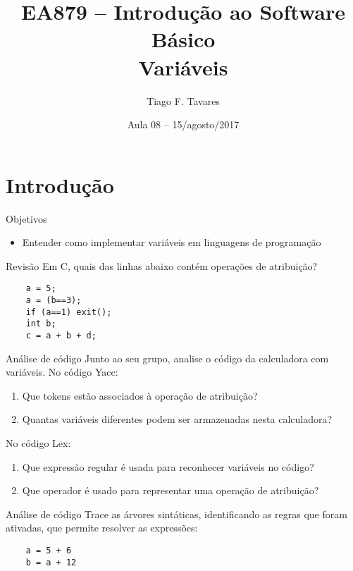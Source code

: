 \documentclass{beamer}
\title[08-Variáveis]{EA879 -- Introdução ao Software Básico\\Variáveis}
\author{Tiago F. Tavares}
\institute{FEEC -- UNICAMP}
\date{Aula 08 -- 15/agosto/2017}
\begin{document}
\begin{frame}
  \titlepage
\end{frame}


\section{Introdução}

\begin{frame}{Objetivos}
  \Large
  \begin{itemize}
    \item Entender como implementar variáveis em linguagens de programação
  \end{itemize}
\end{frame}


\begin{frame}[fragile]{Revisão}
  \centering
  \large
  Em C, quais das linhas abaixo contém operações de atribuição?
  \begin{verbatim}
    a = 5;
    a = (b==3);
    if (a==1) exit();
    int b;
    c = a + b + d;
  \end{verbatim}
\end{frame}

\begin{frame}[fragile]{Análise de código}
  \centering
  \large
  Junto ao seu grupo, analise o código da calculadora com variáveis. No código
  Yacc:
  \begin{enumerate}
    \item Que tokens estão associados à operação de atribuição?
    \item Quantas variáveis diferentes podem ser armazenadas nesta calculadora?
  \end{enumerate}

  No código Lex:
  \begin{enumerate}
    \item Que expressão regular é usada para reconhecer variáveis no código?
    \item Que operador é usado para representar uma operação de atribuição?
  \end{enumerate}
\end{frame}

\begin{frame}[fragile]{Análise de código}
  \centering
  \large
    Trace as árvores sintáticas, identificando as regras que foram ativadas, que
    permite resolver as expressões:
    \begin{verbatim}
    a = 5 + 6
    b = a + 12
    \end{verbatim}

\end{frame}
\end{document}
